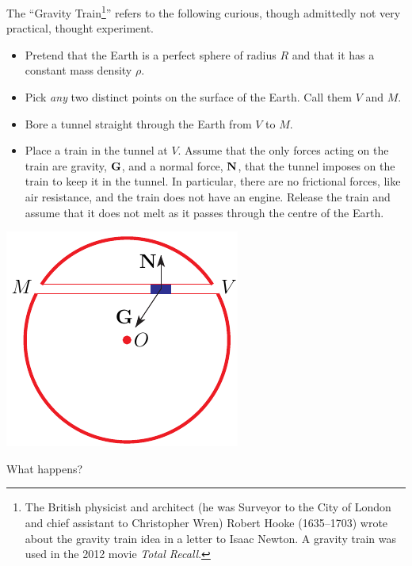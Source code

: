 \begin{eg}\label{eg:gravityTrain}
The ``Gravity Train\footnote{The British physicist and architect
(he was Surveyor to the City of London and chief assistant to Christopher Wren) Robert Hooke (1635--1703) wrote about the gravity train idea in a letter to Isaac Newton. A gravity train was used in the 2012 movie 
\emph{Total Recall}.}'' refers to the following curious, though admittedly
not very practical, thought experiment.

\begin{itemize}
\item
Pretend that the Earth is a perfect sphere of radius $R$ and that 
it has a constant mass density $\rho$.

\item 
Pick \emph{any} two distinct points on the surface of the Earth. Call
them $V$ and $M$.

\item
Bore a tunnel straight through the Earth from $V$ to $M$.

\item
Place a train in the tunnel at $V$. Assume that the only forces acting
on the train are gravity, $\mathbf{G}$, and a normal force, $\mathbf{N}$, that  the tunnel
imposes on the train to keep it in the tunnel. In particular, there are 
no frictional forces, like air resistance, and the train does not
have an engine. Release the train and assume that it does not melt 
as it passes through the centre of the Earth.

\end{itemize}

\begin{nfig}
\begin{center}
    \includegraphics{gravityTrain.pdf}
\end{center}
\end{nfig}
What happens?


\end{eg}
